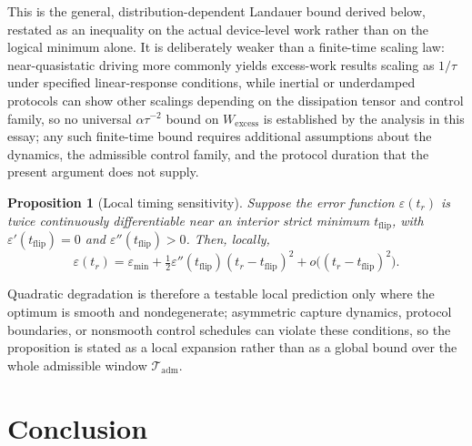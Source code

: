 \documentclass[11pt]{article}
\newtheorem{proposition}{Proposition}
\begin{document}
This is the general, distribution-dependent Landauer bound derived below, restated as an inequality on the actual device-level work rather than on the logical minimum alone. It is deliberately weaker than a finite-time scaling law: near-quasistatic driving more commonly yields excess-work results scaling as $1/\tau$ under specified linear-response conditions, while inertial or underdamped protocols can show other scalings depending on the dissipation tensor and control family, so no universal $\alpha\tau^{-2}$ bound on $W_{\mathrm{excess}}$ is established by the analysis in this essay; any such finite-time bound requires additional assumptions about the dynamics, the admissible control family, and the protocol duration that the present argument does not supply.

\begin{proposition}[Local timing sensitivity]
Suppose the error function $\varepsilon(t_r)$ is twice continuously differentiable near an interior strict minimum $t_{\mathrm{flip}}$, with $\varepsilon'(t_{\mathrm{flip}})=0$ and $\varepsilon''(t_{\mathrm{flip}})>0$. Then, locally,
\[
\varepsilon(t_r) = \varepsilon_{\min} + \tfrac12\varepsilon''(t_{\mathrm{flip}})(t_r-t_{\mathrm{flip}})^2 + o\bigl((t_r-t_{\mathrm{flip}})^2\bigr).
\]
\end{proposition}

Quadratic degradation is therefore a testable local prediction only where the optimum is smooth and nondegenerate; asymmetric capture dynamics, protocol boundaries, or nonsmooth control schedules can violate these conditions, so the proposition is stated as a local expansion rather than as a global bound over the whole admissible window $\mathcal T_{\mathrm{adm}}$.

\section{Conclusion}
\end{document}

